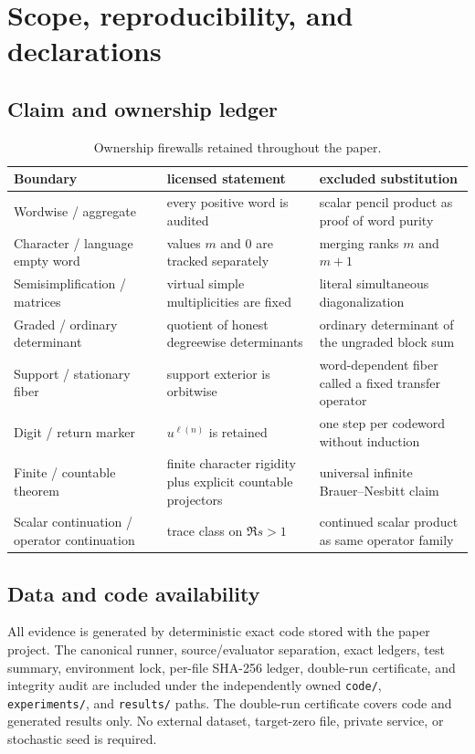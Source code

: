 \section{Scope, reproducibility, and declarations}
\label{app:scope}

\subsection{Claim and ownership ledger}

\begin{table}[htbp]
\centering
\small
\caption{Ownership firewalls retained throughout the paper.}
\label{tab:ownership-ledger}
\begin{tabularx}{\textwidth}{L{39mm} Y Y}
\toprule
Boundary & licensed statement & excluded substitution \\
\midrule
Wordwise / aggregate & every positive word is audited & scalar pencil product as proof of word purity \\
Character / language empty word & values \(m\) and \(0\) are tracked separately & merging ranks \(m\) and \(m+1\) \\
Semisimplification / matrices & virtual simple multiplicities are fixed & literal simultaneous diagonalization \\
Graded / ordinary determinant & quotient of honest degreewise determinants & ordinary determinant of the ungraded block sum \\
Support / stationary fiber & support exterior is orbitwise & word-dependent fiber called a fixed transfer operator \\
Digit / return marker & \(u^{\ell(n)}\) is retained & one step per codeword without induction \\
Finite / countable theorem & finite character rigidity plus explicit countable projectors & universal infinite Brauer--Nesbitt claim \\
Scalar continuation / operator continuation & trace class on \(\Re s>1\) & continued scalar product as same operator family \\
\bottomrule
\end{tabularx}
\end{table}

\subsection{Data and code availability}

All evidence is generated by deterministic exact code stored with the paper
project.  The canonical runner, source/evaluator separation, exact ledgers,
test summary, environment lock, per-file SHA-256 ledger, double-run
certificate, and integrity audit are included under the independently owned
\texttt{code/}, \texttt{experiments/}, and \texttt{results/} paths.  The
double-run certificate covers code and generated results only.  No external
dataset, target-zero file, private service, or stochastic seed is required.

